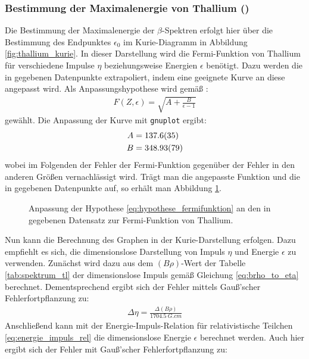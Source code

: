 \documentclass[11pt, a4paper]{article}
\numberwithin{equation}{section}
\begin{document}
\subsubsection{Bestimmung der Maximalenergie von Thallium ()}
\label{sssec:kurie_thallium}
Die Bestimmung der Maximalenergie der $\beta$-Spektren erfolgt hier über die Bestimmung des Endpunktes $\epsilon_0$ im Kurie-Diagramm in Abbildung \ref{fig:thallium_kurie}.
In dieser Darstellung wird die Fermi-Funktion von Thallium für verschiedene Impulse $\eta$ beziehungsweise Energien $\epsilon$ benötigt.
Dazu werden die in \cite{anleitung} gegebenen Datenpunkte extrapoliert, indem eine geeignete Kurve an diese angepasst wird.
Als Anpassungshypothese wird gemäß \cite{fermi_function}:
\begin{align}
	F(Z, \epsilon) = \sqrt{A + \frac{B}{\epsilon - 1}}
	\label{eq:hypothese_fermifunktion}
\end{align}
gewählt.
Die Anpassung der Kurve mit \texttt{gnuplot} ergibt:
\begin{align*}
	A &= \num{137.6 +- 3.5} \\
	B &= \num{348.93 +- 0.79}
\end{align*}
wobei im Folgenden der Fehler der Fermi-Funktion gegenüber der Fehler in den anderen Größen vernachlässigt wird.
Trägt man die angepasste Funktion und die in \cite{anleitung} gegebenen Datenpunkte auf, so erhält man Abbildung \ref{fig:fermi_tl}.
\begin{figure}[h]
	\centering
	
	\caption{Anpassung der Hypothese \eqref{eq:hypothese_fermifunktion} an den in \cite{anleitung} gegebenen Datensatz zur Fermi-Funktion von Thallium.}
	\label{fig:fermi_tl}
\end{figure}
Nun kann die Berechnung des Graphen in der Kurie-Darstellung erfolgen.
Dazu empfiehlt es sich, die dimensionslose Darstellung von Impuls $\eta$ und Energie $\epsilon$ zu verwenden.
Zunächst wird dazu aus dem $(B \rho)$-Wert der Tabelle \ref{tab:spektrum_tl} der dimensionslose Impuls gemäß Gleichung \eqref{eq:brho_to_eta} berechnet.
Dementsprechend ergibt sich der Fehler mittels Gauß'scher Fehlerfortpflanzung zu:
\begin{align}
	\Delta \eta = \frac{\Delta (B \rho)}{\SI{1704.5}{G.cm}}
\end{align}
Anschließend kann mit der Energie-Impuls-Relation für relativistische Teilchen \eqref{eq:energie_impuls_rel} die dimensionslose Energie $\epsilon$ berechnet werden.
Auch hier ergibt sich der Fehler mit Gauß'scher Fehlerfortpflanzung zu:
\end{document}
